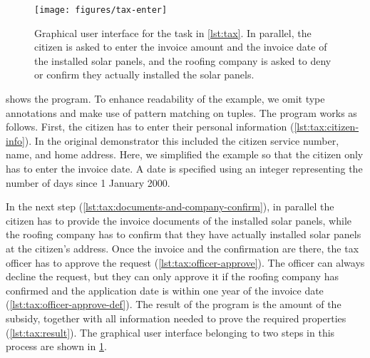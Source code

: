 \begin{figure}[ht]
  \texttt{[image: figures/tax-enter]}
  \caption{
    Graphical user interface for the task in \cref{lst:tax}.
    In parallel, the citizen is asked to enter the invoice amount and the invoice date of the installed solar panels,
    and the roofing company is asked to deny or confirm they actually installed the solar panels.
  }
  \label{fig:tax}
\end{figure}

 shows the program.
To enhance readability of the example,
we omit type annotations and make use of pattern matching on tuples.
The program works as follows.
First, the citizen has to enter their personal information (\cref{lst:tax:citizen-info}).
In the original demonstrator this included the citizen service number, name, and home address.
Here, we simplified the example so that the citizen only has to enter the invoice date.
A date is specified using an integer representing the number of days since 1 January 2000.

In the next step (\cref{lst:tax:documents-and-company-confirm}), in parallel the citizen has to provide the invoice documents of the installed solar panels, while the roofing company has to confirm that they have actually installed solar panels at the citizen's address.
Once the invoice and the confirmation are there, the tax officer has to approve the request (\cref{lst:tax:officer-approve}).
The officer can always decline the request, but they can only approve it if the roofing company has confirmed and the application date is within one year of the invoice date (\cref{lst:tax:officer-approve-def}).
The result of the program is the amount of the subsidy, together with all information needed to prove the required properties (\cref{lst:tax:result}).
The graphical user interface belonging to two steps in this process are shown in \cref{fig:tax}.


